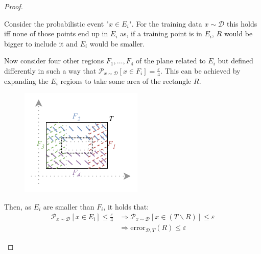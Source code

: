 \begin{theorem}
\begin{proof}
\begin{enumerate}
                Consider the probabilistic event "$x \in E_i$".
                For the training data $x \sim \mathcal{D}$ this holds iff none of those points
                end up in $E_i$ as, if a training point is in $E_i$, $R$ would be bigger to include it and $E_i$ would be smaller.

                Now consider four other regions $F_1, \dots, F_4$ of the plane related to $E_i$ but defined differently
                in such a way that $\mathcal{P}_{x \sim \mathcal{D}}[x \in F_i] = \frac{\varepsilon}{4}$.
                This can be achieved by expanding the $E_i$ regions to take some area of the rectangle $R$.
                \begin{figure}[H]
                    \centering
                    \includegraphics[width=0.35\linewidth]{./img/_rectangle_space2.pdf}
                \end{figure}

                Then, as $E_i$ are smaller than $F_i$, it holds that:
                \begin{equation} \label{eq:rect_prob_to_error}
                    \begin{split}
                        \mathcal{P}_{x \sim \mathcal{D}}[x \in E_i] \leq \frac{\varepsilon}{4} &\Rightarrow 
                            \mathcal{P}_{x \sim \mathcal{D}}[x \in (T \smallsetminus R)] \leq \varepsilon \\
                            & \Rightarrow \text{error}_{\mathcal{D}, T}(R) \leq \varepsilon
                    \end{split}
                \end{equation}


\end{enumerate}
\end{proof}
\end{theorem}
